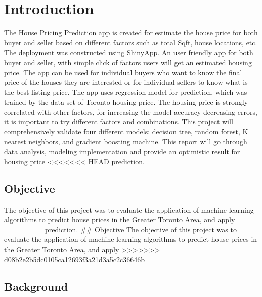 \documentclass[11pt,]{article}
\begin{document}
\vskip -8.5pt



\noindent  

\hypertarget{introduction}{%
\section{Introduction}\label{introduction}}

The House Pricing Prediction app is created for estimate the house price
for both buyer and seller based on different factors such as total Sqft,
house locations, etc. The deployment was constructed using ShinyApp. An
user friendly app for both buyer and seller, with simple click of
factors users will get an estimated housing price. The app can be used
for individual buyers who want to know the final price of the houses
they are interested or for individual sellers to know what is the best
listing price. The app uses regression model for prediction, which was
trained by the data set of Toronto housing price. The housing price is
strongly correlated with other factors, for increasing the model
accuracy decreasing errors, it is important to try different factors and
combinations. This project will comprehensively validate four different
models: decision tree, random forest, K nearest neighbors, and gradient
boosting machine. This report will go through data analysis, modeling
implementation and provide an optimistic result for housing price
<<<<<<< HEAD
prediction.

\hypertarget{objective}{%
\subsection{Objective}\label{objective}}

The objective of this project was to evaluate the application of machine
learning algorithms to predict house prices in the Greater Toronto Area,
and apply
=======
prediction. \#\# Objective The objective of this project was to evaluate
the application of machine learning algorithms to predict house prices
in the Greater Toronto Area, and apply
>>>>>>> d08b2e2b5dc0105ca12693f3a21d3a5c2c36646b

\hypertarget{background}{%
\subsection{Background}\label{background}}
\end{document}
